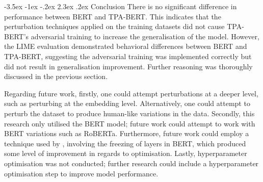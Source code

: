 \documentclass[
]{article}
\makeatletter
\renewcommand\section{\@startsection{section}{1}{\z@}%
  {-3.5ex \@plus -1ex \@minus -.2ex}%
  {2.3ex \@plus .2ex}%
  {\normalfont\fontsize{12}{14}\selectfont\bfseries}}
\makeatother
\begin{document}
\section{Conclusion}
There is no significant difference in performance between BERT and TPA-BERT. This indicates that the perturbation techniques applied on the training datasets did not cause TPA-BERT's adversarial training to increase the generalisation of the model. However, the LIME evaluation demonstrated behavioral differences between BERT and TPA-BERT, suggesting the adversarial training was implemented correctly but did not result in generalisation improvement. Further reasoning was thoroughly discussed in the previous section. 

Regarding future work, firstly, one could attempt perturbations at a deeper level, such as perturbing at the embedding level. Alternatively, one could attempt to perturb the dataset to produce human-like variations in the data. Secondly, this research only utilised the BERT model; future work could attempt to work with BERT variations such as RoBERTa. Furthermore, future work could employ a technique used by \textcite{BERT-finetuning}, involving the freezing of layers in BERT, which produced some level of improvement in regards to optimisation. Lastly, hyperparameter optimisation was not conducted; further research could include a hyperparameter optimisation step to improve model performance.

\printbibliography
\end{document}
